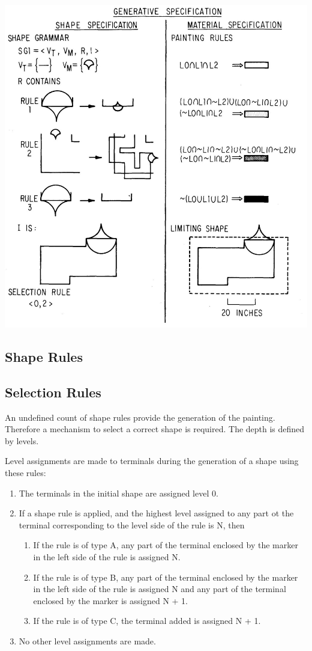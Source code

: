 \documentclass[11pt, a4paper]{report}
\begin{document}
\includegraphics{generativ_specification}
\subsection{Shape Rules}


\subsection{Selection Rules}
An undefined count of shape rules provide the generation of the painting. Therefore a mechanism to select a correct shape is required. The depth is defined by levels.
\begin{displayquote}
    Level assignments are made to terminals during the generation of a shape using these rules:
    \begin{enumerate}
        \item The terminals in the initial shape are assigned level 0.
        \item If a shape rule is applied, and the highest level assigned to any part ot the terminal corresponding to the level side of the rule is N, then
        \begin{enumerate}
            \item If the rule is of type A, any part of the terminal enclosed by the marker in the left side of the rule is assigned N.
            \item If the rule is of type B, any part of the terminal enclosed by the marker in the left side of the rule is assigned N and any part of the terminal enclosed by the marker is assigned N + 1.
            \item If the rule is of type C, the terminal added is assigned N + 1.
        \end{enumerate}
        \item No other level assignments are made.
    \end{enumerate}
\end{displayquote}
\end{document}
